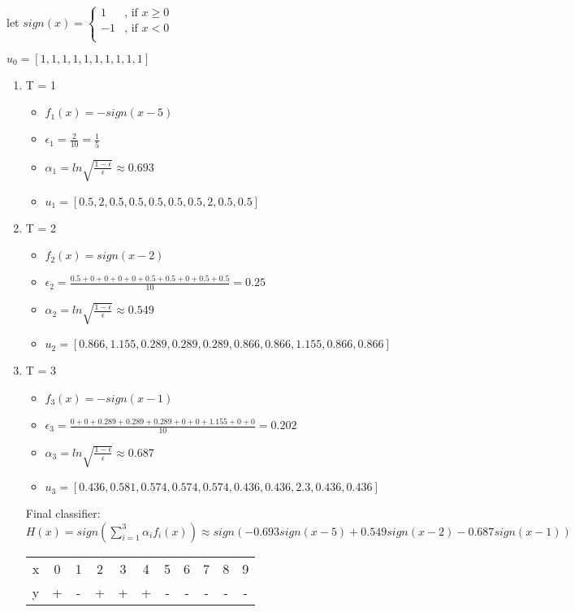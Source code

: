 \documentclass[12pt, a4paper]{article}
\begin{document}
\begin{enumerate}
let $sign(x) = 
\begin{cases}
    1&\text{, if } x \geq 0\\
    -1&\text{, if } x < 0\\
\end{cases}
$\par
$u_0 = [1, 1, 1, 1, 1, 1, 1, 1, 1, 1]$
\begin{enumerate}
    \item T = 1
    \begin{itemize}
        \item $f_1(x) = -sign(x-5)$
        \item $\epsilon_1 = \frac{2}{10} = \frac{1}{5}$
        \item $\alpha_1 = ln\sqrt{\frac{1-\epsilon}{\epsilon}} \approx 0.693$
        \item $u_1 = [0.5, 2, 0.5, 0.5, 0.5, 0.5, 0.5, 2, 0.5, 0.5]$
    \end{itemize}
    \item T = 2
    \begin{itemize}
        \item $f_2(x) = sign(x-2)$
        \item $\epsilon_2 = \frac{0.5+0+0+0+0+0.5+0.5+0+0.5+0.5}{10} = 0.25$
        \item $\alpha_2 = ln\sqrt{\frac{1-\epsilon}{\epsilon}} \approx 0.549$
        \item $u_2 = [0.866, 1.155, 0.289, 0.289, 0.289, 0.866, 0.866, 1.155, 0.866, 0.866]$
    \end{itemize}
    \item T = 3
    \begin{itemize}
        \item $f_3(x) = -sign(x-1)$
        \item $\epsilon_3 = \frac{0+0+0.289+0.289+0.289+0+0+1.155+0+0}{10} = 0.202$
        \item $\alpha_3 = ln\sqrt{\frac{1-\epsilon}{\epsilon}} \approx 0.687$
        \item $u_3 = [0.436, 0.581, 0.574, 0.574, 0.574, 0.436, 0.436, 2.3, 0.436, 0.436]$
    \end{itemize}
    Final classifier: $H(x) = sign(\sum\limits_{i=1}^3 \alpha_i f_i(x)) \approx sign(-0.693sign(x-5) + 0.549 sign(x-2) - 0.687 sign(x-1))$
    \begin{table}[H]
        \centering
        \begin{tabular}{c|cccccccccc}\hline
            x&0&1&2&3&4&5&6&7&8&9\\
            y&+&-&+&+&+&-&-&-&-&-\\ \hline
        \end{tabular}
    \end{table}
\end{enumerate}


\end{enumerate}
\end{document}
